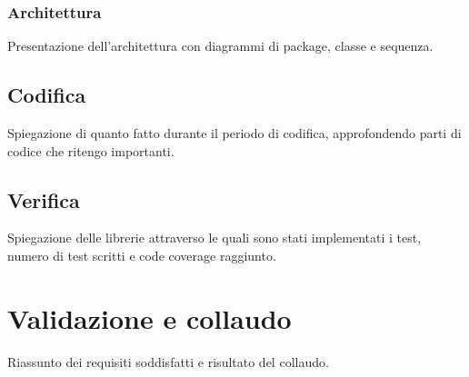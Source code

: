 \subsubsection{Architettura}
Presentazione dell'architettura con diagrammi di package, classe e sequenza.

\subsection{Codifica}
Spiegazione di quanto fatto durante il periodo di codifica, approfondendo parti di codice che ritengo importanti.

\subsection{Verifica}
Spiegazione delle librerie attraverso le quali sono stati implementati i test, numero di test scritti e code coverage raggiunto.


\section{Validazione e collaudo}
Riassunto dei requisiti soddisfatti e risultato del collaudo.






